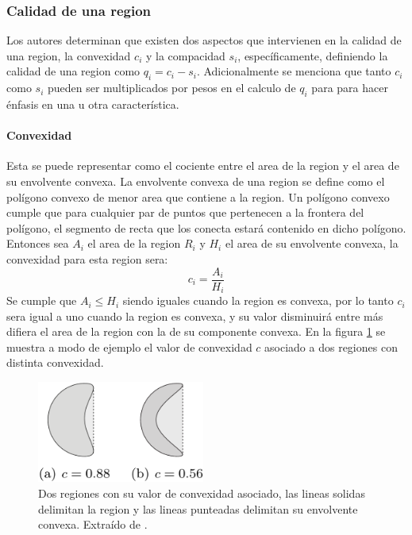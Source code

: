 \subsubsection{Calidad de una region}
Los autores determinan que existen dos aspectos que intervienen en la calidad de una region, la convexidad $c_i$ y la compacidad $s_i$, específicamente, definiendo la calidad de una region como $q_i = c_i - s_i$. Adicionalmente se menciona que tanto $c_i$ como $s_i$ pueden ser multiplicados por pesos en el calculo de $q_i$ para  para hacer énfasis en una u otra característica.

\paragraph{Convexidad}
Esta se puede representar como el cociente entre el area de la region y el area de su envolvente convexa. La envolvente convexa de una region se define como el polígono convexo de menor area que contiene a la region. Un polígono convexo cumple que para cualquier par de puntos que pertenecen a la frontera del polígono, el segmento de recta que los conecta estará contenido en dicho polígono. Entonces sea $A_i$ el area de la region $R_i$ y $H_i$ el area de su envolvente convexa, la convexidad para esta region sera:
\begin{equation}
  c_i=\frac{A_i}{H_i}
\end{equation}
Se cumple que $A_i \leq H_i$ siendo iguales cuando la region es convexa, por lo tanto $c_i$ sera igual a uno cuando la region es convexa, y su valor disminuirá entre más difiera el area de la region con la de su componente convexa. En la figura \ref{fig:ejemplConvexidad} se muestra a modo de ejemplo el valor de convexidad $c$ asociado a dos regiones con distinta convexidad.
\begin{figure}[ht]
  \center
  \includegraphics[width=5.5cm]{imagenes/convexidad.png}
  \caption{Dos regiones con su valor de convexidad asociado, las lineas solidas delimitan la region y las lineas punteadas delimitan su envolvente convexa. Extraído de \cite{Liu2015}.}\label{fig:ejemplConvexidad}
\end{figure} 

